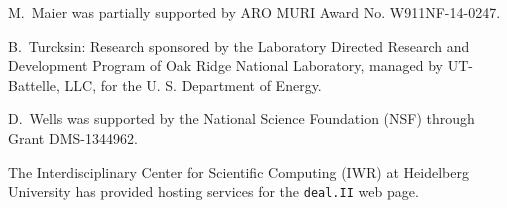 \documentclass{ansarticle-preprint}
\newcommand{\specialword}[1]{\texttt{#1}}
\newcommand{\dealii}{{\specialword{deal.II}}\xspace}
\begin{document}
M.~Maier was partially supported by ARO MURI Award No. W911NF-14-0247.

B.~Turcksin: Research sponsored by the Laboratory Directed Research and
Development Program of Oak Ridge National Laboratory, managed by UT-Battelle,
LLC, for the U. S. Department of Energy.

D.~Wells was supported by the National Science Foundation (NSF) through Grant
DMS-1344962.

The Interdisciplinary Center for Scientific Computing (IWR) at Heidelberg
University has provided hosting services for the \dealii web page.


{}

\end{document}
